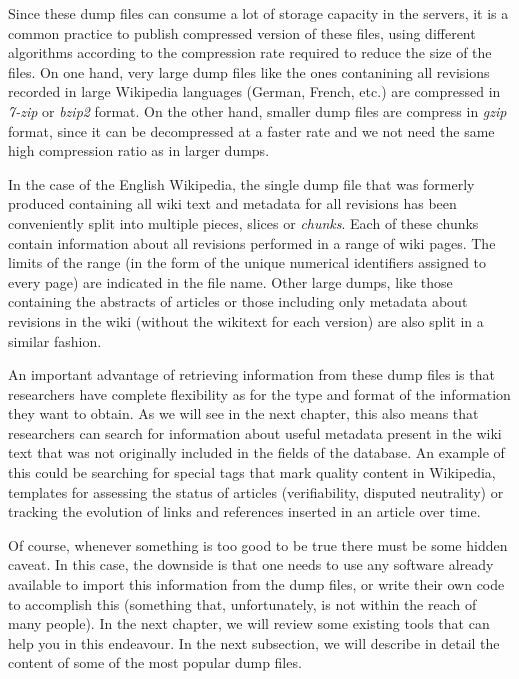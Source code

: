 Since these dump files can consume a lot of storage capacity in the servers, it
is a common practice to publish compressed version of these files, using different
algorithms according to the compression rate required to reduce the size of the
files. On one hand, very large dump files like the ones
contanining all revisions recorded in large Wikipedia languages (German, French,
etc.) are compressed in \textit{7-zip} or \textit{bzip2} format. On the other hand, smaller dump
files are compress in \textit{gzip} format, since it can be decompressed at a faster rate 
and we not need the same high compression ratio as in larger dumps.

In the case of the English Wikipedia, the single dump file that was formerly produced
containing all wiki text and metadata for all revisions has
been conveniently split into multiple pieces, slices or \textit{chunks}. Each of 
these chunks contain information about all revisions performed in a range of wiki pages.
The limits of the range (in the form of the unique numerical identifiers assigned
to every page) are indicated in the file name. Other large dumps, like those
containing the abstracts of articles or those including only metadata about
revisions in the wiki (without the wikitext for each version) are also split in
a similar fashion.

An important advantage of retrieving information from these dump files is that
researchers have complete flexibility as for the type and format of the information
they want to obtain. As we will see in the next chapter, this also means that
researchers can search for information about useful metadata present in the wiki
text that was not originally included in the fields of the database. An example
of this could be searching for special tags that mark quality content in
Wikipedia, templates for assessing the status of articles (verifiability, disputed
neutrality) or tracking the evolution of links and references inserted in an
article over time.

Of course, whenever something is too good to be true there must be some hidden
caveat. In this case, the downside is that one needs to use any software already
available to import this information from the dump files, or write their own
code to accomplish this (something that, unfortunately, is not within the reach of many people).
In the next chapter, we will review some existing tools that can help you in this
endeavour. In the next subsection, we will describe in detail the content of some of the most
popular dump files.

